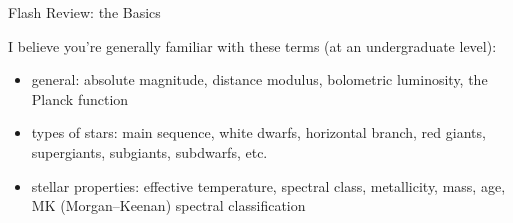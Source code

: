 \documentclass[letterpaper,landscape]{slides}
\begin{document}


\begin{slide}
\begin{center}
{\large \color{red} 
                                Flash Review: the Basics
}
\end{center}


{\color{blue} I believe you're generally familiar with these terms (at an undergraduate level):}

\begin{itemize}
\item {\color{blue}general:} absolute magnitude, distance modulus, 
                             bolometric luminosity, the Planck function
\item {\color{blue}types of stars:} main sequence, white dwarfs, horizontal branch, 
                           red giants, supergiants, subgiants, subdwarfs, etc.
\item {\color{blue}stellar properties:} effective temperature, spectral class, 
                           metallicity, mass, age, MK (Morgan–Keenan) spectral classification
\end{itemize}     
     
\vfill
\end{slide}
\end{document}

